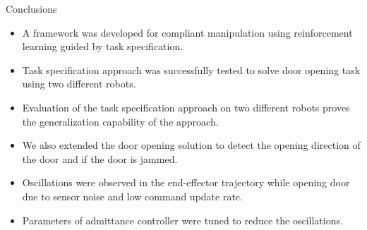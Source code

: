 \documentclass[aspectratio=43,10pt,fleqn,t]{beamer}
\begin{document}
\begin{frame}{Conclusions}


\begin{minipage}[t]{0.51\textwidth}
\begin{itemize}
\small 
\item A framework was developed for compliant manipulation using reinforcement learning guided by task specification. 
\item Task specification approach was successfully tested to solve door opening task using two different robots.
\item Evaluation of the task specification approach on two different robots proves the generalization capability of the approach.
\item We also extended the door opening solution to detect the opening direction of the door and if the door is jammed. 
\end{itemize}
\end{minipage}
\hfill
\begin{minipage}[t]{0.47\textwidth}
\begin{itemize}
\small
  
\item Oscillations were observed in the end-effector trajectory while opening door due to sensor noise and low command update rate.
\item Parameters of admittance controller were tuned to reduce the oscillations.

\end{itemize}
\end{minipage}
\end{frame}
\end{document}
